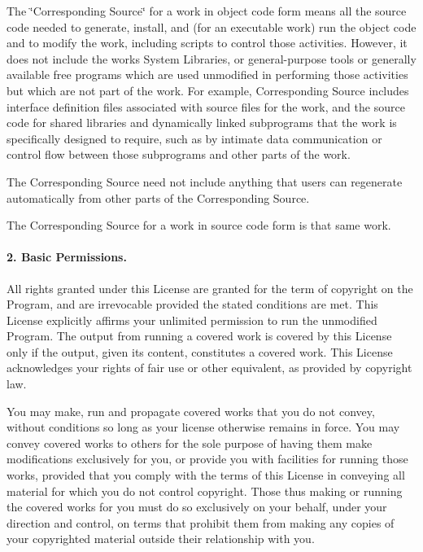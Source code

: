 The \char`\"{}\+Corresponding Source\char`\"{} for a work in object code form means all the source code needed to generate, install, and (for an executable work) run the object code and to modify the work, including scripts to control those activities. However, it does not include the work\textquotesingle{}s System Libraries, or general-\/purpose tools or generally available free programs which are used unmodified in performing those activities but which are not part of the work. For example, Corresponding Source includes interface definition files associated with source files for the work, and the source code for shared libraries and dynamically linked subprograms that the work is specifically designed to require, such as by intimate data communication or control flow between those subprograms and other parts of the work.

The Corresponding Source need not include anything that users can regenerate automatically from other parts of the Corresponding Source.

The Corresponding Source for a work in source code form is that same work.

\paragraph*{2. Basic Permissions.}

All rights granted under this License are granted for the term of copyright on the Program, and are irrevocable provided the stated conditions are met. This License explicitly affirms your unlimited permission to run the unmodified Program. The output from running a covered work is covered by this License only if the output, given its content, constitutes a covered work. This License acknowledges your rights of fair use or other equivalent, as provided by copyright law.

You may make, run and propagate covered works that you do not convey, without conditions so long as your license otherwise remains in force. You may convey covered works to others for the sole purpose of having them make modifications exclusively for you, or provide you with facilities for running those works, provided that you comply with the terms of this License in conveying all material for which you do not control copyright. Those thus making or running the covered works for you must do so exclusively on your behalf, under your direction and control, on terms that prohibit them from making any copies of your copyrighted material outside their relationship with you.

